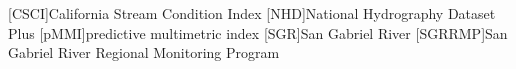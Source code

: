 \usepackage{lineno}
\linenumbers
\usepackage{setspace}
\linespread{1}
\usepackage{cleveref}
\usepackage{acronym}
\usepackage{booktabs}
\usepackage{multirow}
[CSCI]{California Stream Condition Index}
[NHD]{National Hydrography Dataset Plus}
[pMMI]{predictive multimetric index}
[SGR]{San Gabriel River}
[SGRRMP]{San Gabriel River Regional Monitoring Program}
